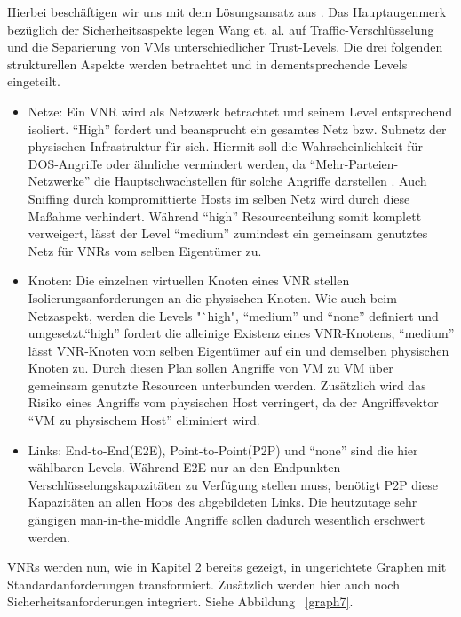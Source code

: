\documentclass{lni}
\begin{document}
Hierbei beschäftigen wir uns mit dem Lösungsansatz aus \cite{wang2016towards}. 
Das Hauptaugenmerk bezüglich der Sicherheitsaspekte legen Wang et. al. auf Traffic-Verschlüsselung und die Separierung von VMs unterschiedlicher Trust-Levels. Die drei folgenden strukturellen Aspekte werden betrachtet und in dementsprechende Levels eingeteilt.
\begin{itemize}
\item Netze:\newline
Ein VNR wird als Netzwerk betrachtet und seinem Level entsprechend isoliert. "`High"' fordert und beansprucht ein gesamtes Netz bzw. Subnetz der physischen Infrastruktur für sich. Hiermit soll die Wahrscheinlichkeit für DOS-Angriffe oder ähnliche vermindert werden, da "`Mehr-Parteien-Netzwerke"' die Hauptschwachstellen für solche Angriffe darstellen \cite{DOS}. Auch Sniffing durch kompromittierte Hosts im selben Netz wird durch diese Maßahme verhindert. Während "`high"' Resourcenteilung somit komplett verweigert, lässt der Level "`medium"' zumindest ein gemeinsam genutztes Netz für VNRs vom selben Eigentümer zu.

\item Knoten:\newline
Die einzelnen virtuellen Knoten eines VNR stellen Isolierungsanforderungen an die physischen Knoten. Wie auch beim Netzaspekt, werden die Levels "`high", "`medium"' und "`none"' definiert und umgesetzt."`high"' fordert die alleinige Existenz eines VNR-Knotens, "`medium"' lässt VNR-Knoten vom selben Eigentümer auf ein und demselben physischen Knoten zu. Durch diesen Plan sollen Angriffe von VM zu VM über gemeinsam genutzte Resourcen unterbunden werden. Zusätzlich wird das Risiko eines Angriffs vom physischen Host verringert, da der Angriffsvektor "`VM zu physischem Host"' eliminiert wird.

\item Links:\newline
End-to-End(E2E), Point-to-Point(P2P) und "`none"' sind die hier wählbaren Levels. Während E2E nur an den Endpunkten Verschlüsselungskapazitäten zu Verfügung stellen muss, benötigt P2P diese Kapazitäten an allen Hops des abgebildeten Links. Die heutzutage sehr gängigen man-in-the-middle Angriffe sollen dadurch wesentlich erschwert werden. 
\end{itemize}
VNRs werden nun, wie in Kapitel 2 bereits gezeigt, in ungerichtete Graphen mit Standardanforderungen transformiert. Zusätzlich werden hier auch noch Sicherheitsanforderungen integriert. Siehe Abbildung ~\ref{graph7}.\newline
\end{document}
